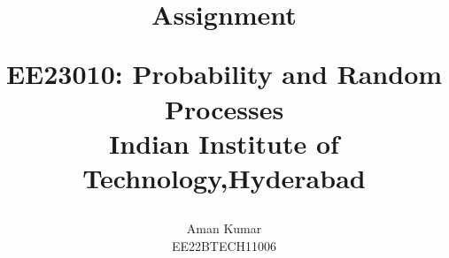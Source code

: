 \documentclass[journal,12pt,twocolumn]{IEEEtran}
\theoremstyle{remark}
\begin{document}
%




\vspace{3cm}

\title{
Assignment

\Large{EE23010: Probability and Random Processes}\\
Indian Institute of Technology,Hyderabad
}
\author{ Aman Kumar 

EE22BTECH11006
}	


%
%
%

% 
%



% 
\end{document}
